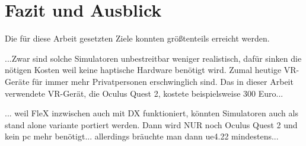 \chapter{Fazit und Ausblick}

Die für diese Arbeit gesetzten Ziele konnten größtenteils erreicht werden. 

...Zwar sind solche Simulatoren unbestreitbar weniger realistisch, dafür sinken die nötigen Kosten weil keine haptische Hardware benötigt wird. Zumal heutige VR-Geräte für immer mehr Privatpersonen erschwinglich sind. Das in dieser Arbeit verwendete VR-Gerät, die Oculus Quest 2, kostete beispielsweise 300 Euro...

... weil FleX inzwischen auch mit DX funktioniert, könnten Simulatoren auch als stand alone variante portiert werden. Dann wird NUR  noch Oculus Quest 2 und kein pc mehr benötigt... allerdings bräuchte man dann ue4.22 mindestens...


